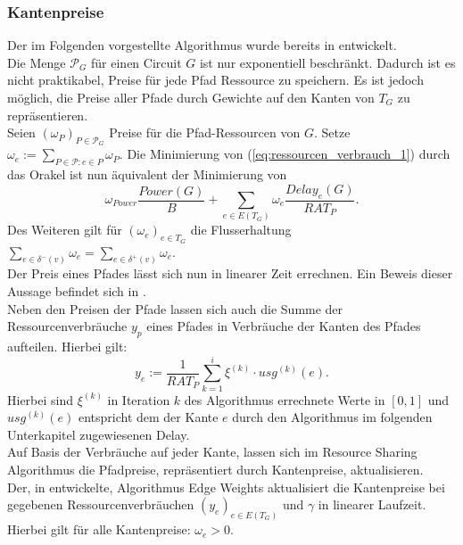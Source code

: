 \documentclass[11pt, a4paper, german]{article}
\begin{document}
\subsubsection{Kantenpreise}\label{subsubsec:kantenpreise}
Der im Folgenden vorgestellte Algorithmus wurde bereits in \cite{Daboul2018} entwickelt. \\
Die Menge $\mathcal{P}_G$ für einen Circuit $G$ ist nur exponentiell beschränkt. Dadurch ist es nicht praktikabel, Preise für jede Pfad Ressource zu speichern. Es ist jedoch möglich, die Preise aller Pfade durch Gewichte auf den Kanten von $T_G$ zu repräsentieren. \\
Seien $(\omega _P)_{P \in \mathcal{P}_G}$ Preise für die Pfad-Ressourcen von $G$. Setze $\omega _e := \sum\limits_{P \in \mathcal{P} : e \in P} \omega _P$.  Die Minimierung von (\ref{eq:ressourcen_verbrauch_1}) durch das Orakel ist nun äquivalent der Minimierung von 
\begin{equation}\label{eq:ressourcen_verbrauch_2}
\omega _{Power} \frac{Power(G)}{B} + \sum\limits_{e \in E(T_G)} \omega_e \frac{Delay_e(G)}{RAT_P}.
\end{equation}
Des Weiteren gilt für $(\omega_e)_{e \in T_G}$ die Flusserhaltung $\sum_{e \in  \delta^- (v)} \omega_e = \sum_{e \in  \delta^+ (v)} \omega_e $.\\

Der Preis eines Pfades lässt sich nun in linearer Zeit errechnen. Ein Beweis dieser Aussage befindet sich in \cite{Haehnle2015}.\\
Neben den Preisen der Pfade lassen sich auch die Summe der Ressourcenverbräuche $y_p$ eines Pfades in Verbräuche der Kanten des Pfades aufteilen. Hierbei gilt: 
\begin{equation}\label{eq:ress_verbr}
y_e := \frac{1}{RAT_P} \sum\limits_{k=1}^i \xi^{(k)} \cdot usg^{(k)}(e).
\end{equation}
Hierbei sind $\xi^{(k)}$ in Iteration $k$ des Algorithmus errechnete Werte in $[0,1]$ und $usg^{(k)}(e)$ entspricht dem der Kante $e$ durch den Algorithmus im folgenden Unterkapitel zugewiesenen Delay.\\
Auf Basis der Verbräuche auf jeder Kante, lassen sich im Resource Sharing Algorithmus die Pfadpreise, repräsentiert durch Kantenpreise,  aktualisieren. \\

Der, in \cite{Daboul2018} entwickelte, Algorithmus Edge Weights aktualisiert die Kantenpreise bei gegebenen Ressourcenverbräuchen $(y_e)_{e\in E(T_G)}$ und $\gamma$ in linearer Laufzeit. Hierbei gilt für alle Kantenpreise: $\omega_e > 0$. 
\end{document}
